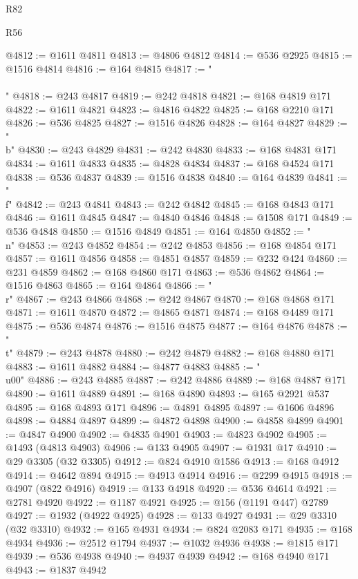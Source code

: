 \begin{lexlean}{R82}
\begin{lexlean}{R56}
\begin{coremodule}
{{{{{{{{{{{{{{{{{{{{{{{{{{{{{{{{{{{{{{{{{{{{{{{{{{{{{{{{{{{{{{{{{{{{{{{{{{{{{{{{{{{{{{{{{{{{{{{{{{{{{{{{{{{{{{{{{{{{{{{{{{{{{{{{{{{{{{{{{{{{{{{{{{{{{{{{{{{{{{{{{{{{{{{{{{{{{{{{{{{{{{{{{{{{{{{{{{{{{{{{{{{{{{{{{{{@4812 := @1611 @4811
@4813 := @4806 @4812
@4814 := @536 @2925
@4815 := @1516 @4814
@4816 := @164 @4815
@4817 := "\\\\"
@4818 := @243 @4817
@4819 := @242 @4818
@4821 := @168 @4819 @171
@4822 := @1611 @4821
@4823 := @4816 @4822
@4825 := @168 @2210 @171
@4826 := @536 @4825
@4827 := @1516 @4826
@4828 := @164 @4827
@4829 := "\\b"
@4830 := @243 @4829
@4831 := @242 @4830
@4833 := @168 @4831 @171
@4834 := @1611 @4833
@4835 := @4828 @4834
@4837 := @168 @4524 @171
@4838 := @536 @4837
@4839 := @1516 @4838
@4840 := @164 @4839
@4841 := "\\f"
@4842 := @243 @4841
@4843 := @242 @4842
@4845 := @168 @4843 @171
@4846 := @1611 @4845
@4847 := @4840 @4846
@4848 := @1508 @171
@4849 := @536 @4848
@4850 := @1516 @4849
@4851 := @164 @4850
@4852 := "\\n"
@4853 := @243 @4852
@4854 := @242 @4853
@4856 := @168 @4854 @171
@4857 := @1611 @4856
@4858 := @4851 @4857
@4859 := @232 @424
@4860 := @231 @4859
@4862 := @168 @4860 @171
@4863 := @536 @4862
@4864 := @1516 @4863
@4865 := @164 @4864
@4866 := "\\r"
@4867 := @243 @4866
@4868 := @242 @4867
@4870 := @168 @4868 @171
@4871 := @1611 @4870
@4872 := @4865 @4871
@4874 := @168 @4489 @171
@4875 := @536 @4874
@4876 := @1516 @4875
@4877 := @164 @4876
@4878 := "\\t"
@4879 := @243 @4878
@4880 := @242 @4879
@4882 := @168 @4880 @171
@4883 := @1611 @4882
@4884 := @4877 @4883
@4885 := "\\u00"
@4886 := @243 @4885
@4887 := @242 @4886
@4889 := @168 @4887 @171
@4890 := @1611 @4889
@4891 := @168 @4890
@4893 := @165 @2921 @537
@4895 := @168 @4893 @171
@4896 := @4891 @4895
@4897 := @1606 @4896
@4898 := @4884 @4897
@4899 := @4872 @4898
@4900 := @4858 @4899
@4901 := @4847 @4900
@4902 := @4835 @4901
@4903 := @4823 @4902
@4905 := @1493 (@4813 @4903)
@4906 := @133 @4905
@4907 := @1931 @17
@4910 := @29 @3305 (@32 @3305)
@4912 := @824 @4910 @1586
@4913 := @168 @4912
@4914 := @4642 @894
@4915 := @4913 @4914
@4916 := @2299 @4915
@4918 := @4907 (@822 @4916)
@4919 := @133 @4918
@4920 := @536 @4614
@4921 := @2781 @4920
@4922 := @1187 @4921
@4925 := @156 (@1191 @447) @2789
@4927 := @1932 (@4922 @4925)
@4928 := @133 @4927
@4931 := @29 @3310 (@32 @3310)
@4932 := @165 @4931
@4934 := @824 @2083 @171
@4935 := @168 @4934
@4936 := @2512 @1794
@4937 := @1032 @4936
@4938 := @1815 @171
@4939 := @536 @4938
@4940 := @4937 @4939
@4942 := @168 @4940 @171
@4943 := @1837 @4942
}}}}}}}}}}}}}}}}}}}}}}}}}}}}}}}}}}}}}}}}}}}}}}}}}}}}}}}}}}}}}}}}}}}}}}}}}}}}}}}}}}}}}}}}}}}}}}}}}}}}}}}}}}}}}}}}}}}}}}}}}}}}}}}}}}}}}}}}}}}}}}}}}}}}}}}}}}}}}}}}}}}}}}}}}}}}}}}}}}}}}}}}}}}}}}}}}}}}}}}}}}}}}}}}}}}
\end{coremodule}
\end{lexlean}
\end{lexlean}
